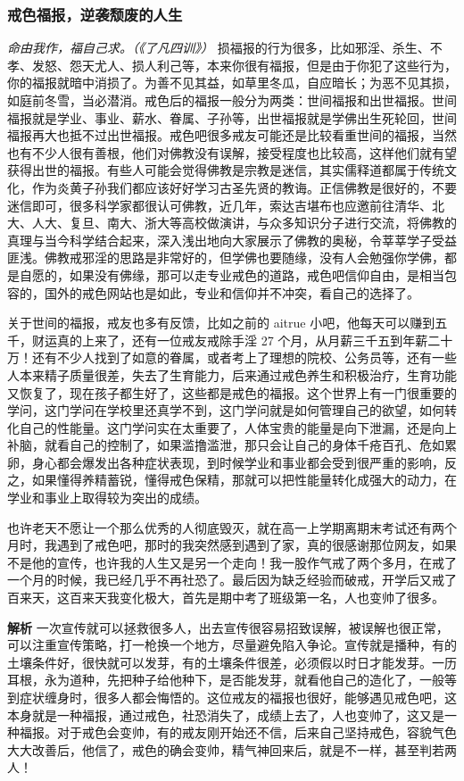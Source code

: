 \subsubsection{戒色福报，逆袭颓废的人生}

\textit{命由我作，福自己求。（《了凡四训》）} 损福报的行为很多，比如邪淫、杀生、不孝、发怒、怨天尤人、损人利己等，本来你很有福报，但是由于你犯了这些行为，你的福报就暗中消损了。为善不见其益，如草里冬瓜，自应暗长；为恶不见其损，如庭前冬雪，当必潜消。戒色后的福报一般分为两类：世间福报和出世福报。世间福报就是学业、事业、薪水、眷属、子孙等，出世福报就是学佛出生死轮回，世间福报再大也抵不过出世福报。戒色吧很多戒友可能还是比较看重世间的福报，当然也有不少人很有善根，他们对佛教没有误解，接受程度也比较高，这样他们就有望获得出世的福报。有些人可能会觉得佛教是宗教是迷信，其实儒释道都属于传统文化，作为炎黄子孙我们都应该好好学习古圣先贤的教诲。正信佛教是很好的，不要迷信即可，很多科学家都很认可佛教，近几年，索达吉堪布也应邀前往清华、北大、人大、复旦、南大、浙大等高校做演讲，与众多知识分子进行交流，将佛教的真理与当今科学结合起来，深入浅出地向大家展示了佛教的奥秘，令莘莘学子受益匪浅。佛教戒邪淫的思路是非常好的，但学佛也要随缘，没有人会勉强你学佛，都是自愿的，如果没有佛缘，那可以走专业戒色的道路，戒色吧信仰自由，是相当包容的，国外的戒色网站也是如此，专业和信仰并不冲突，看自己的选择了。

关于世间的福报，戒友也多有反馈，比如之前的 aitrue 小吧，他每天可以赚到五千，财运真的上来了，还有一位戒友戒除手淫 27 个月，从月薪三千五到年薪二十万！还有不少人找到了如意的眷属，或者考上了理想的院校、公务员等，还有一些人本来精子质量很差，失去了生育能力，后来通过戒色养生和积极治疗，生育功能又恢复了，现在孩子都生好了，这些都是戒色的福报。这个世界上有一门很重要的学问，这门学问在学校里还真学不到，这门学问就是如何管理自己的欲望，如何转化自己的性能量。这门学问实在太重要了，人体宝贵的能量是向下泄漏，还是向上补脑，就看自己的控制了，如果滥撸滥泄，那只会让自己的身体千疮百孔、危如累卵，身心都会爆发出各种症状表现，到时候学业和事业都会受到很严重的影响，反之，如果懂得养精蓄锐，懂得戒色保精，那就可以把性能量转化成强大的动力，在学业和事业上取得较为突出的成绩。

\begin{case}
    也许老天不愿让一个那么优秀的人彻底毁灭，就在高一上学期离期末考试还有两个月时，我遇到了戒色吧，那时的我突然感到遇到了家，真的很感谢那位网友，如果不是他的宣传，也许我的人生又是另一个走向！我一股作气戒了两个多月，在戒了一个月的时候，我已经几乎不再社恐了。最后因为缺乏经验而破戒，开学后又戒了百来天，这百来天我变化极大，首先是期中考了班级第一名，人也变帅了很多。

    \textbf{解析} 一次宣传就可以拯救很多人，出去宣传很容易招致误解，被误解也很正常，可以注重宣传策略，打一枪换一个地方，尽量避免陷入争论。宣传就是播种，有的土壤条件好，很快就可以发芽，有的土壤条件很差，必须假以时日才能发芽。一历耳根，永为道种，先把种子给他种下，是否能发芽，就看他自己的造化了，一般等到症状缠身时，很多人都会悔悟的。这位戒友的福报也很好，能够遇见戒色吧，这本身就是一种福报，通过戒色，社恐消失了，成绩上去了，人也变帅了，这又是一种福报。对于戒色会变帅，有的戒友刚开始还不信，后来自己坚持戒色，容貌气色大大改善后，他信了，戒色的确会变帅，精气神回来后，就是不一样，甚至判若两人！
\end{case}

